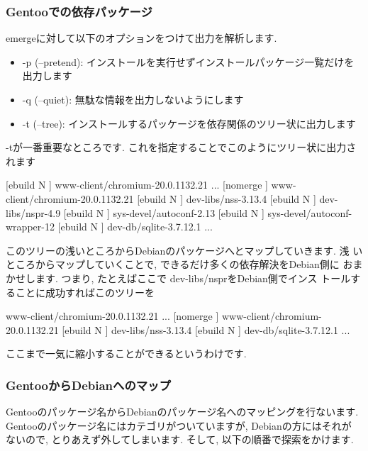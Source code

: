 \documentclass[mingoth,a4paper]{jsarticle}
\begin{document}
\subsubsection{Gentooでの依存パッケージ}

emergeに対して以下のオプションをつけて出力を解析します.

\begin{itemize}
\item -p (--pretend): インストールを実行せずインストールパッケージ一覧だけを出力します
\item -q (--quiet): 無駄な情報を出力しないようにします
\item -t (--tree): インストールするパッケージを依存関係のツリー状に出力します
\end{itemize}

-tが一番重要なところです. これを指定することでこのようにツリー状に出力されます

\begin{commandline}
[ebuild  N    ] www-client/chromium-20.0.1132.21 
...
[nomerge      ] www-client/chromium-20.0.1132.21 
[ebuild  N    ]  dev-libs/nss-3.13.4 
[ebuild  N    ]   dev-libs/nspr-4.9 
[ebuild  N    ]    sys-devel/autoconf-2.13 
[ebuild  N    ]     sys-devel/autoconf-wrapper-12 
[ebuild  N    ]   dev-db/sqlite-3.7.12.1 
...
\end{commandline}

このツリーの浅いところからDebianのパッケージへとマップしていきます. 浅
いところからマップしていくことで, できるだけ多くの依存解決をDebian側に
おまかせします. つまり, たとえばここで dev-libs/nsprをDebian側でインス
トールすることに成功すればこのツリーを

\begin{commandline}
[ebuild  N    ] www-client/chromium-20.0.1132.21 
...
[nomerge      ] www-client/chromium-20.0.1132.21 
[ebuild  N    ]  dev-libs/nss-3.13.4 
[ebuild  N    ]   dev-db/sqlite-3.7.12.1 
...
\end{commandline}

ここまで一気に縮小することができるというわけです. 

\subsubsection{GentooからDebianへのマップ}

Gentooのパッケージ名からDebianのパッケージ名へのマッピングを行ないます.
Gentooのパッケージ名にはカテゴリがついていますが, Debianの方にはそれが
ないので, とりあえず外してしまいます. そして, 以下の順番で探索をかけます. 
\end{document}
